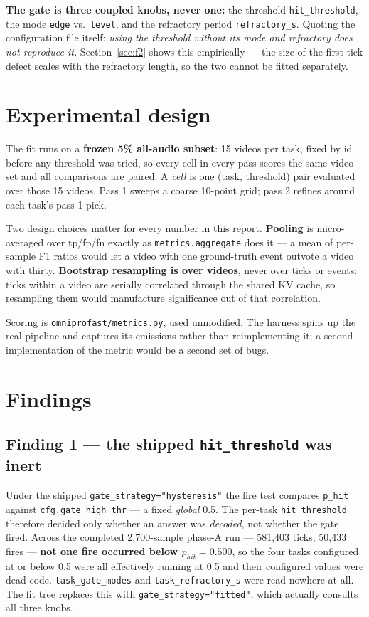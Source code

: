 \documentclass[11pt,a4paper]{article}
\begin{document}
\textbf{The gate is three coupled knobs, never one:} the threshold
\texttt{hit\_threshold}, the mode \texttt{edge} vs.\ \texttt{level}, and the
refractory period \texttt{refractory\_s}. Quoting the configuration file itself:
\emph{using the threshold without its mode and refractory does not reproduce it.}
Section~\ref{sec:f2} shows this empirically --- the size of the first-tick defect
scales with the refractory length, so the two cannot be fitted separately.

\section{Experimental design}

The fit runs on a \textbf{frozen 5\% all-audio subset}: 15 videos per
task, fixed by id before any threshold was tried, so every cell in every pass
scores the same video set and all comparisons are paired. A \emph{cell} is one
(task, threshold) pair evaluated over those 15 videos. Pass 1 sweeps a coarse
10-point grid; pass 2 refines around each task's pass-1 pick.

Two design choices matter for every number in this report.
\textbf{Pooling} is micro-averaged over tp/fp/fn exactly as
\texttt{metrics.aggregate} does it --- a mean of per-sample F1 ratios would let a
video with one ground-truth event outvote a video with thirty.
\textbf{Bootstrap resampling is over videos}, never over ticks or events: ticks
within a video are serially correlated through the shared KV cache, so resampling
them would manufacture significance out of that correlation.

Scoring is \texttt{omniprofast/metrics.py}, used unmodified. The harness
spins up the real pipeline and captures its emissions rather than reimplementing
it; a second implementation of the metric would be a second set of bugs.

\section{Findings}

\subsection{Finding 1 --- the shipped \texttt{hit\_threshold} was inert}

Under the shipped \texttt{gate\_strategy="hysteresis"} the fire test
compares \texttt{p\_hit} against \texttt{cfg.gate\_high\_thr} --- a fixed
\emph{global} 0.5. The per-task
\texttt{hit\_threshold} therefore decided only whether an answer was
\emph{decoded}, not whether the gate fired. Across the completed 2{,}700-sample
phase-A run --- 581{,}403 ticks, 50{,}433 fires --- \textbf{not one fire occurred
below $p_\mathit{hit}=0.500$}, so the four tasks configured at or below 0.5 were
all effectively running at 0.5 and their configured values were dead code.
\texttt{task\_gate\_modes} and \texttt{task\_refractory\_s} were read nowhere at
all. The fit tree replaces this with \texttt{gate\_strategy="fitted"}, which
actually consults all three knobs.
\end{document}
